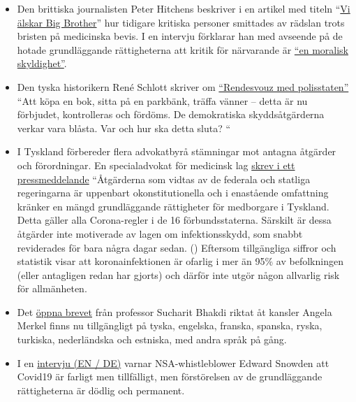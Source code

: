 \begin{itemize}
\tightlist
\item
  Den brittiska journalisten Peter Hitchens beskriver i en artikel med
  titeln
  ``\href{https://www.firstthings.com/web-exclusives/2020/04/we-love-big-brother}{Vi
  älskar Big Brother}'' hur tidigare kritiska personer smittades av
  rädslan trots bristen på medicinska bevis. I en intervju förklarar han
  med avseende på de hotade grundläggande rättigheterna att kritik för
  närvarande är
  \href{https://www.spiked-online.com/podcast-episode/in-this-lockdown-dissent-is-a-moral-duty/}{``en
  moralisk skyldighet''}.
\item
  Den tyska historikern René Schlott skriver om
  \href{https://www.spiegel.de/politik/deutschland/corona-krise-und-buergerrechte-rendezvous-mit-dem-polizeistaat-a-68611322-f4d4-453f-aba5-5ec5a49ae329}{``Rendesvouz
  med polisstaten''} ``Att köpa en bok, sitta på en parkbänk, träffa
  vänner -- detta är nu förbjudet, kontrolleras och fördöms. De
  demokratiska skyddsåtgärderna verkar vara blåsta. Var och hur ska
  detta sluta? ``
\item
  I Tyskland förbereder flera advokatbyrå stämningar mot antagna
  åtgärder och förordningar. En specialadvokat för medicinsk lag
  \href{http://beatebahner.de/lib.medien/aktualisierte\%20Pressemitteilung.pdf}{skrev
  i ett pressmeddelande} ``Åtgärderna som vidtas av de federala och
  statliga regeringarna är uppenbart okonstitutionella och i enastående
  omfattning kränker en mängd grundläggande rättigheter för medborgare i
  Tyskland. Detta gäller alla Corona-regler i de 16 förbundsstaterna.
  Särskilt är dessa åtgärder inte motiverade av lagen om
  infektionsskydd, som snabbt reviderades för bara några dagar sedan. ()
  Eftersom tillgängliga siffror och statistik visar att
  koronainfektionen är ofarlig i mer än 95\% av befolkningen (eller
  antagligen redan har gjorts) och därför inte utgör någon allvarlig
  risk för allmänheten.
\item
  Det
  \href{https://swprs.org/offener-brief-von-professor-sucharit-bhakdi-an-bundeskanzlerin-dr-angela-merkel/}{öppna
  brevet} från professor Sucharit Bhakdi riktat åt kansler Angela Merkel
  finns nu tillgängligt på tyska, engelska, franska, spanska, ryska,
  turkiska, nederländska och estniska, med andra språk på gång.
\item
  I en \href{https://www.youtube.com/watch?v=-pcQFTzck_c}{intervju (EN /
  DE)} varnar NSA-whistleblower Edward Snowden att Covid19 är farligt
  men tillfälligt, men förstörelsen av de grundläggande rättigheterna är
  dödlig och permanent.
\end{itemize}


